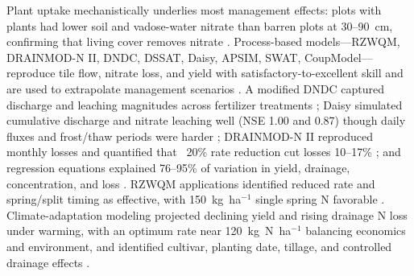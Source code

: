 \documentclass[11pt]{article}
\begin{document}
Plant uptake mechanistically underlies most management effects: plots with plants had lower soil and vadose-water nitrate than barren plots at 30--90~cm, confirming that living cover removes nitrate \parencite{Bosompemaa2021}. Process-based models---RZWQM, DRAINMOD-N II, DNDC, DSSAT, Daisy, APSIM, SWAT, CoupModel---reproduce tile flow, nitrate loss, and yield with satisfactory-to-excellent skill and are used to extrapolate management scenarios \parencite{Jeong2018,Ahmed2007b,Ale2012b,Pasley2021,Motarjemi2021,Conrad2009}. A modified DNDC captured discharge and leaching magnitudes across fertilizer treatments \parencite{Li2006}; Daisy simulated cumulative discharge and nitrate leaching well (NSE 1.00 and 0.87) though daily fluxes and frost/thaw periods were harder \parencite{Motarjemi2021}; DRAINMOD-N II reproduced monthly losses and quantified that ~20\% rate reduction cut losses 10--17\% \parencite{Ale2012b}; and regression equations explained 76--95\% of variation in yield, drainage, concentration, and loss \parencite{Malone2007}. RZWQM applications identified reduced rate and spring/split timing as effective, with 150~kg~ha$^{-1}$ single spring N favorable \parencite{Azevedo1997,Malone2007b}. Climate-adaptation modeling projected declining yield and rising drainage N loss under warming, with an optimum rate near 120~kg~N~ha$^{-1}$ balancing economics and environment, and identified cultivar, planting date, tillage, and controlled drainage effects \parencite{Wang2016b}.
\end{document}
